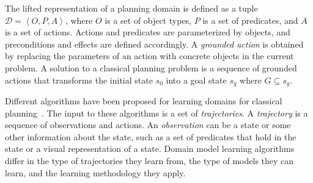 \documentclass{article}
\theoremstyle{definition}
\theoremstyle{remark}
\newcommand{\tuple}[1]{\ensuremath{\left \langle #1 \right \rangle }}
\newif\ifaddcomments
\newcommand{\todo}[1]{\ifaddcomments{\textcolor{red}{[TODO: #1]}}\fi}
\newcommand{\roni}[1]{\ifaddcomments{\textcolor{red}{[Roni: #1]}}\fi}
\newcommand{\yarin}[1]{\ifaddcomments{\textcolor{teal}{[Yarin: #1]}}\fi}
\newcommand{\cm}[1]{\ifaddcomments{\textcolor{olive}{[Christian: #1]}}\fi}
\begin{document}
The lifted representation of a planning domain is defined as a tuple $\mathcal{D} = \tuple{O, P, A}$, where $O$ is a set of object types, $P$ is a set of predicates, and $A$ is a set of actions. Actions and predicates are parameterized by objects, and preconditions and effects are defined accordingly.
A \emph{grounded action} is obtained by replacing the parameters of an action with concrete objects in the current problem. 
A solution to a classical planning problem is a sequence of grounded actions that transforms the initial state $s_0$ into a goal state $s_g$ where $G\subseteq s_g$. 

Different algorithms have been proposed for learning domains for classical planning~\citep{macq,aineto2019learning,jimenez2012review}. 
The input to these algorithms is a set of \emph{trajectories}. 
A \emph{trajectory} is a sequence of observations and actions. 
An \emph{observation} can be a state or some other information about the state, 
such as a set of predicates that hold in the state or a visual representation of a state. 
Domain model learning algorithms differ in the type of trajectories they learn from, the type of models they can learn, 
and the learning methodology they apply. 


\end{document}
